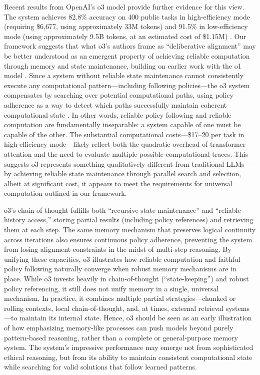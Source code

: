 \documentclass[12pt]{article}
\begin{document}
Recent results from OpenAI's o3 model provide further evidence for this view.
The system achieves 82.8\% accuracy on 400 public tasks in high-efficiency mode (requiring \$6{,}677, using approximately 33M tokens) and 91.5\% in low-efficiency mode (using approximately 9.5B tokens, at an estimated cost of \$1.15M) \cite{chollet2024o3}.
Our framework suggests that what o3's authors frame as ``deliberative alignment'' \cite{openai2024o3blog,guan2024deliberative} may be better understood as an emergent property of achieving reliable computation through memory and state maintenance, building on earlier work with the o1 model \cite{openai2024learning}.
Since a system without reliable state maintenance cannot consistently execute any computational pattern---including following policies---the o3 system compensates by searching over potential computational paths, using policy adherence as a way to detect which paths successfully maintain coherent computational state \cite{chollet2024o3, openai2024learning}.
In other words, reliable policy following and reliable computation are fundamentally inseparable: a system capable of one must be capable of the other.
The substantial computational costs---\$17--20 per task in high-efficiency mode---likely reflect both the quadratic overhead of transformer attention and the need to evaluate multiple possible computational traces.
This suggests o3 represents something qualitatively different from traditional LLMs \cite{willison2024o3}---by achieving reliable state maintenance through parallel search and selection, albeit at significant cost, it appears to meet the requirements for universal computation outlined in our framework.

o3's chain-of-thought fulfills both ``recursive state maintenance'' and ``reliable history access,'' storing partial results (including policy references) and retrieving them at each step.
The same memory mechanism that preserves logical continuity across iterations also ensures continuous policy adherence, preventing the system from losing alignment constraints in the midst of multi-step reasoning.
By unifying these capacities, o3 illustrates how reliable computation and faithful policy following naturally converge when robust memory mechanisms are in place.
While o3 invests heavily in chain-of-thought (``state-keeping'') and robust policy referencing, it still does not unify memory in a single, universal mechanism.
In practice, it combines multiple partial strategies---chunked or rolling contexts, local chain-of-thought, and, at times, external retrieval systems---to maintain its internal state.
Hence, o3 should be seen as an early illustration of how emphasizing memory-like processes can push models beyond purely pattern-based reasoning, rather than a complete or general-purpose memory system.
The system's impressive performance may emerge not from sophisticated ethical reasoning, but from its ability to maintain consistent computational state while searching for valid solutions that follow learned patterns.
\end{document}

